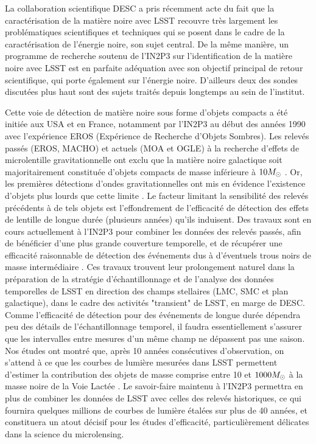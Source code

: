 \documentclass[12pt]{article}
\begin{document}
La collaboration scientifique DESC a pris récemment acte du fait que la caractérisation de la matière noire avec LSST recouvre très largement les problématiques scientifiques et techniques qui se posent dans le cadre de la caractérisation de l'énergie noire, son sujet central.
De la même manière, un programme de recherche soutenu de l'IN2P3 sur l'identification de la matière noire avec LSST est en parfaite adéquation avec son objectif principal de retour scientifique, qui porte également sur l'énergie noire. D'ailleurs deux des sondes discutées plus haut sont des sujets traités depuis longtemps au sein de l'institut.

Cette voie de détection de matière noire sous forme d'objets compacts a été initiée aux USA et en France, notamment par l'IN2P3 au début des
années 1990 avec l'expérience EROS (Expérience de Recherche d'Objets Sombres).
Les relevés passés (EROS, MACHO) et actuels (MOA et OGLE) à la recherche d'effets de microlentille gravitationnelle ont exclu que la matière noire galactique soit majoritairement constituée d'objets compacts de masse inférieure à $10M_\odot$ \citep{Tisserand2007,OGLE2010}. Or, les premières détections d'ondes gravitationnelles ont mis en évidence l'existence d'objets plus lourds que cette limite \citep{GW1,Bird}.
Le facteur limitant la sensibilité des relevés précédents à de tels objets est l'effondrement de
l'efficacité de détection des effets de lentille de longue durée (plusieurs années) qu'ils induisent.
Des travaux sont en cours actuellement à l'IN2P3 pour combiner les données des relevés passés, afin de bénéficier d'une plus grande couverture temporelle, et
de récupérer une efficacité raisonnable de détection des événements dus à d'éventuels trous noirs de masse intermédiaire \citep{MEMO}.
Ces travaux trouvent leur prolongement naturel dans la préparation de la stratégie d'échantillonnage et de
l'analyse des données temporelles de LSST en direction des champs stellaires (LMC, SMC et plan galactique), dans le cadre
des activités "transient" de LSST, en marge de DESC.
Comme l'efficacité de détection pour des événements de longue durée dépendra peu des détails de l'échantillonnage temporel, il faudra essentiellement
s'assurer que les intervalles entre mesures d'un même champ ne dépassent pas une saison. Nos études ont montré que,
après 10 années consécutives d'observation, on s'attend à ce que
les courbes de lumière mesurées dans LSST permettent d'estimer la contribution des objets de masse comprise entre
10 et $1000M_\odot$ à la masse noire de la Voie Lactée \citep{MEMO}. Le savoir-faire maintenu à l'IN2P3 permettra en plus
de combiner les données de LSST avec celles des relevés historiques, ce qui fournira quelques millions de courbes de lumière
étalées sur plus de 40 années, et constituera un atout décisif pour les études d'efficacité, particulièrement délicates dans
la science du microlensing.
\end{document}
